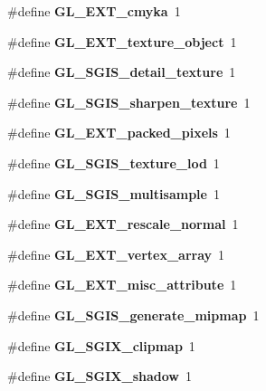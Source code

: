 \begin{DoxyCompactItemize}
\item 
\#define {\bfseries G\+L\+\_\+\+E\+X\+T\+\_\+cmyka}~1\label{_s_d_l__opengl_8h_a001806ea06c909df692ea03cae36a9c4}

\item 
\#define {\bfseries G\+L\+\_\+\+E\+X\+T\+\_\+texture\+\_\+object}~1\label{_s_d_l__opengl_8h_a0a8f95fb14f4807a9234103764127e1c}

\item 
\#define {\bfseries G\+L\+\_\+\+S\+G\+I\+S\+\_\+detail\+\_\+texture}~1\label{_s_d_l__opengl_8h_a9311509df521f028caabe7dcf70bc1f2}

\item 
\#define {\bfseries G\+L\+\_\+\+S\+G\+I\+S\+\_\+sharpen\+\_\+texture}~1\label{_s_d_l__opengl_8h_ad3226a8bb7dca380d920bdba8206f129}

\item 
\#define {\bfseries G\+L\+\_\+\+E\+X\+T\+\_\+packed\+\_\+pixels}~1\label{_s_d_l__opengl_8h_a37aa82ac7d4e8a36e3975a238e65f121}

\item 
\#define {\bfseries G\+L\+\_\+\+S\+G\+I\+S\+\_\+texture\+\_\+lod}~1\label{_s_d_l__opengl_8h_a0a02ea2d5a3680049831b5be637295f3}

\item 
\#define {\bfseries G\+L\+\_\+\+S\+G\+I\+S\+\_\+multisample}~1\label{_s_d_l__opengl_8h_add53d59948c91cfb914450c9b8019491}

\item 
\#define {\bfseries G\+L\+\_\+\+E\+X\+T\+\_\+rescale\+\_\+normal}~1\label{_s_d_l__opengl_8h_adce03eecce70994872ed60eb1ab3cff8}

\item 
\#define {\bfseries G\+L\+\_\+\+E\+X\+T\+\_\+vertex\+\_\+array}~1\label{_s_d_l__opengl_8h_ac525507a0e70bcdbeea036484a0eea62}

\item 
\#define {\bfseries G\+L\+\_\+\+E\+X\+T\+\_\+misc\+\_\+attribute}~1\label{_s_d_l__opengl_8h_a5a3606df50a00c69af87fe196498af42}

\item 
\#define {\bfseries G\+L\+\_\+\+S\+G\+I\+S\+\_\+generate\+\_\+mipmap}~1\label{_s_d_l__opengl_8h_a608de9897caa4c408b6f1083abe1c2ba}

\item 
\#define {\bfseries G\+L\+\_\+\+S\+G\+I\+X\+\_\+clipmap}~1\label{_s_d_l__opengl_8h_a44ac70e5591a89f52d738cec23897229}

\item 
\#define {\bfseries G\+L\+\_\+\+S\+G\+I\+X\+\_\+shadow}~1\label{_s_d_l__opengl_8h_a555b635cf8eeafa4334ae29f09da6b84}


\end{DoxyCompactItemize}
